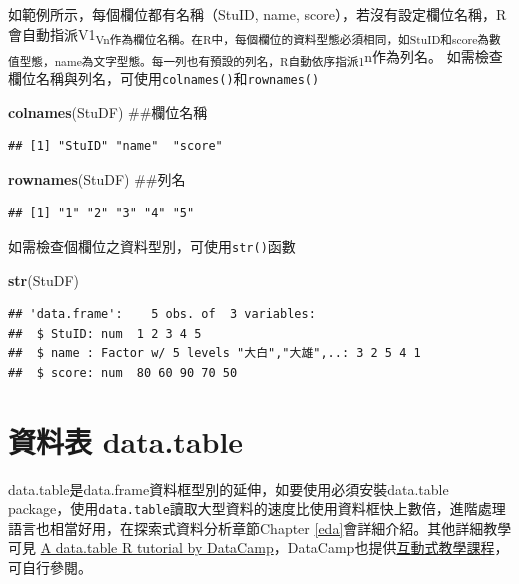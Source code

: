 \documentclass[]{book}
\newenvironment{Shaded}{\begin{snugshade}}{\end{snugshade}}
\newcommand{\KeywordTok}[1]{\textcolor[rgb]{0.13,0.29,0.53}{\textbf{{#1}}}}
\newcommand{\NormalTok}[1]{{#1}}
\theoremstyle{definition}
\theoremstyle{definition}
\theoremstyle{remark}
\begin{document}
如範例所示，每個欄位都有名稱（StuID, name,
score），若沒有設定欄位名稱，R會自動指派V1\textsubscript{Vn作為欄位名稱。在R中，每個欄位的資料型態必須相同，如StuID和score為數值型態，name為文字型態。每一列也有預設的列名，R自動依序指派1}n作為列名。
如需檢查欄位名稱與列名，可使用\texttt{colnames()}和\texttt{rownames()}

\begin{Shaded}
\begin{Highlighting}[]
\KeywordTok{colnames}\NormalTok{(StuDF) ##欄位名稱}
\end{Highlighting}
\end{Shaded}

\begin{verbatim}
## [1] "StuID" "name"  "score"
\end{verbatim}

\begin{Shaded}
\begin{Highlighting}[]
\KeywordTok{rownames}\NormalTok{(StuDF) ##列名}
\end{Highlighting}
\end{Shaded}

\begin{verbatim}
## [1] "1" "2" "3" "4" "5"
\end{verbatim}

如需檢查個欄位之資料型別，可使用\texttt{str()}函數

\begin{Shaded}
\begin{Highlighting}[]
\KeywordTok{str}\NormalTok{(StuDF) }
\end{Highlighting}
\end{Shaded}

\begin{verbatim}
## 'data.frame':    5 obs. of  3 variables:
##  $ StuID: num  1 2 3 4 5
##  $ name : Factor w/ 5 levels "大白","大雄",..: 3 2 5 4 1
##  $ score: num  80 60 90 70 50
\end{verbatim}

\section{資料表 data.table}\label{-data.table}

data.table是data.frame資料框型別的延伸，如要使用必須安裝data.table
\citep{R-data.table}
package，使用\texttt{data.table}讀取大型資料的速度比使用資料框快上數倍，進階處理語言也相當好用，在探索式資料分析章節Chapter
\ref{eda}會詳細介紹。其他詳細教學可見
\href{https://www.datacamp.com/community/tutorials/data-table-r-tutorial\#gs.vzMYa_k}{A
data.table R tutorial by
DataCamp}，DataCamp也提供\href{https://www.datacamp.com/courses/data-table-data-manipulation-r-tutorial}{互動式教學課程}，可自行參閱。
\end{document}
